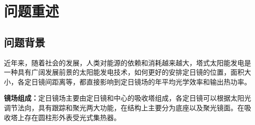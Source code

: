 \documentclass[withoutpreface,bwprint]{cumcmthesis} %
\begin{document}



































































\section{问题重述}
\subsection{问题背景}
近年来，随着社会的发展，人类对能源的依赖和消耗越来越大，塔式太阳能发电是一种具有广阔发展前景的太阳能发电技术，如何更好的安排定日镜的位置，面积大小，各定日镜间距离等，都直接影响到定日镜场的年平均光学效率和输出热功率。

\textbf{镜场组成：}定日镜场主要由定日镜和中心的吸收塔组成，各定日镜可以根据太阳光调节法向，具有跟踪和聚光两大功能，在结构上主要分为底座以及聚光镜面。在吸收塔上存在圆柱形外表受光式集热器。
\end{document}
